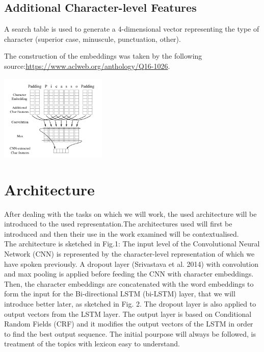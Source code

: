 \documentclass[twocolumn,10pt]{wmrDoc}
\begin{document}
\subsection{Additional Character-level Features}
A search table is used to generate a 4-dimensional
vector representing the type of character (superior
case, minuscule, punctuation, other).

The construction of the embeddings was taken by the following source:\url{https://www.aclweb.org/anthology/Q16-1026}.


\vskip 0.5cm

\includegraphics[width=0.38\textwidth]{figure/charEmbb.png}

\section{Architecture}

After dealing with the tasks on which we will work, the used architecture will be introduced to the used representation.The architectures used will first be introduced and then their use in the work examined will be contextualised.\\
The architecture is sketched in Fig.1: The input level of the Convolutional Neural Network (CNN) is represented by the character-level representation  of which we have spoken previously. A dropout layer \cite{DBLP:journals/jmlr/SrivastavaHKSS14}(Srivastava et al. 2014) with convolution and max pooling is applied before feeding the CNN with character embeddings. 
Then, the character embeddings are concatenated with the word embeddings to form the input
for the Bi-directional LSTM (bi-LSTM) layer, that we will introduce better later, as sketched in Fig. 2. 
The dropout layer is also applied to output vectors from the LSTM layer. 
The output layer is based on Conditional Random Fields (CRF) and it modifies the output vectors of the LSTM in order to find the best output sequence.
The initial pourpose will always be followed, is treatment of the topics with lexicon easy to understand.
\end{document}
